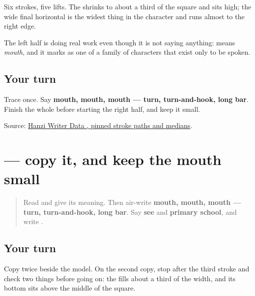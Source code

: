 Six strokes, five lifts. The \textbf{} shrinks to about a third of the square and sits high; the wide final horizontal is the widest thing in the character and runs almost to the right edge.

The left half is doing real work even though it is not saying anything: \textbf{} means \emph{mouth}, and it marks  as one of a family of characters that exist only to be spoken.

\subsection*{Your turn}
Trace \textbf{} once. Say \textbf{mouth, mouth, mouth — turn, turn-and-hook, long bar}. Finish the whole  before starting the right half, and keep it small.

\begin{tcolorbox}[breakable,colback=teal!4,colframe=teal!35!black,title={Before you move on}]
Source: \href{https://raw.githubusercontent.com/chanind/hanzi-writer-data/68d10a4b21150cae5e1ebbd223eed289cf32d90c/data/\%E5\%90\%97.json}{Hanzi Writer Data , pinned stroke paths and medians}.
\end{tcolorbox}
\section[\texorpdfstring{\zh{吗} (ma)}{吗 (ma)}]{ — copy it, and keep the mouth small}

\label{lesson:ZH-W19-ma-guided}



\begin{quote}
Read \textbf{} and give its meaning. Then air-write \textbf{mouth, mouth, mouth — turn, turn-and-hook, long bar}. Say \textbf{see} and \textbf{primary school}, and write \textbf{}.
\end{quote}

\subsection*{Your turn}

Copy \textbf{} twice beside the model. On the second copy, stop after the third stroke and check two things before going on: the  fills about a third of the width, and its bottom sits above the middle of the square.

